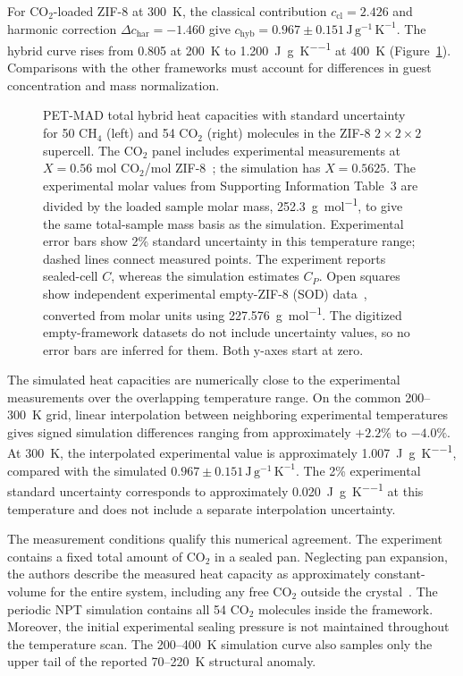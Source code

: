 \documentclass[12pt,a4paper]{article}
\numberwithin{equation}{section}
\begin{document}
For CO$_2$-loaded ZIF-8 at \SI{300}{K}, the classical contribution
$c_{\mathrm{cl}}=2.426$ and harmonic correction
$\Delta c_{\mathrm{har}}=-1.460$ give
$c_{\mathrm{hyb}}=0.967\pm0.151\,\mathrm{J\,g^{-1}\,K^{-1}}$.
The hybrid curve rises from 0.805 at \SI{200}{K} to
\SI{1.200}{J\per g\per K} at \SI{400}{K}
(Figure~\ref{fig:results-zif8-additional}). Comparisons with the other
frameworks must account for differences in guest concentration and
mass normalization.

\begin{figure}[htbp]
  \centering
  \zifeighttotal
  \caption{PET-MAD total hybrid heat capacities with standard uncertainty
  for 50 CH$_4$ (left) and 54 CO$_2$ (right) molecules in the ZIF-8
  $2\times2\times2$ supercell. The CO$_2$ panel includes experimental measurements at
  $X=0.56$ mol CO$_2$/mol ZIF-8~\cite{rosen2020co2}; the simulation has
  $X=0.5625$. The experimental molar values from Supporting Information
  Table~3 are divided by the loaded sample molar mass,
  \SI{252.3}{g\per mol}, to give the same total-sample mass basis as the
  simulation. Experimental error bars show 2\% standard uncertainty in
  this temperature range; dashed lines connect measured points. The
  experiment reports sealed-cell $C$, whereas the simulation estimates
  $C_P$. Open squares show independent experimental empty-ZIF-8 (SOD)
  data~\cite{rosen2019zif8}, converted from molar units using
  \SI{227.576}{g\per mol}. The digitized empty-framework datasets do
  not include uncertainty values, so no error bars are inferred for them.
  Both y-axes start at zero.}
  \label{fig:results-zif8-additional}
\end{figure}

The simulated heat capacities are numerically close to the
experimental measurements over the overlapping temperature range. On the common 200--\SI{300}{K} grid,
linear interpolation between neighboring experimental temperatures gives
signed simulation differences ranging from approximately $+2.2\%$
to $-4.0\%$.
At \SI{300}{K}, the interpolated experimental value is approximately
\SI{1.007}{J\per g\per K}, compared with the simulated
$0.967\pm0.151\,\mathrm{J\,g^{-1}\,K^{-1}}$. The 2\% experimental
standard uncertainty corresponds to approximately
\SI{0.020}{J\per g\per K} at this temperature and does not include a
separate interpolation uncertainty.

The measurement conditions qualify this numerical agreement. The
experiment contains a fixed total amount of CO$_2$ in a sealed pan.
Neglecting pan expansion, the authors describe the measured heat capacity
as approximately constant-volume for the entire system, including any
free CO$_2$ outside the crystal~\cite{rosen2020co2}. The periodic NPT
simulation contains all 54 CO$_2$ molecules inside the framework.
Moreover, the initial experimental sealing pressure is not maintained
throughout the temperature scan. The 200--\SI{400}{K} simulation curve
also samples only the upper tail of the reported 70--\SI{220}{K}
structural anomaly.
\end{document}
